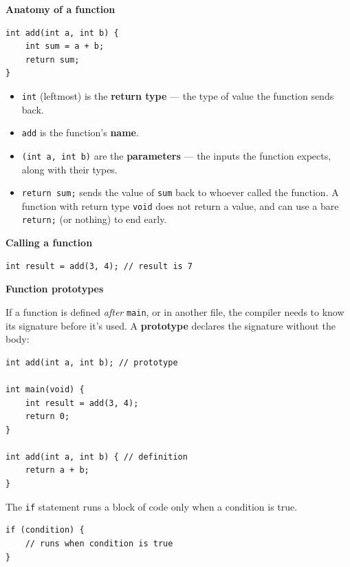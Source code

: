 \documentclass[11pt,a4paper]{article}
\providecommand{\tightlist}{\setlength{\itemsep}{0pt}\setlength{\parskip}{0pt}}
\begin{document}
\textbf{Anatomy of a function}

\begin{lstlisting}[style=cscode]
int add(int a, int b) {
    int sum = a + b;
    return sum;
}
\end{lstlisting}

\begin{itemize}
\tightlist
\item
  \texttt{int} (leftmost) is the \textbf{return type} --- the type of value the function sends back.
\item
  \texttt{add} is the function's \textbf{name}.
\item
  \texttt{(int\ a,\ int\ b)} are the \textbf{parameters} --- the inputs the function expects, along with their types.
\item
  \texttt{return\ sum;} sends the value of \texttt{sum} back to whoever called the function. A function with return type \texttt{void} does not return a value, and can use a bare \texttt{return;} (or nothing) to end early.
\end{itemize}

\textbf{Calling a function}

\begin{lstlisting}[style=cscode]
int result = add(3, 4); // result is 7
\end{lstlisting}

\textbf{Function prototypes}

If a function is defined \emph{after} \texttt{main}, or in another file, the compiler needs to know its signature before it's used. A \textbf{prototype} declares the signature without the body:

\begin{lstlisting}[style=cscode]
int add(int a, int b); // prototype

int main(void) {
    int result = add(3, 4);
    return 0;
}

int add(int a, int b) { // definition
    return a + b;
}
\end{lstlisting}

\label{12-conditional-statements}
\hypertarget{12-conditional-statements}{}

\label{121-ifelse-constructs}
\hypertarget{121-ifelse-constructs}{}

The \texttt{if} statement runs a block of code only when a condition is true.

\begin{lstlisting}[style=cscode]
if (condition) {
    // runs when condition is true
}
\end{lstlisting}
\end{document}
